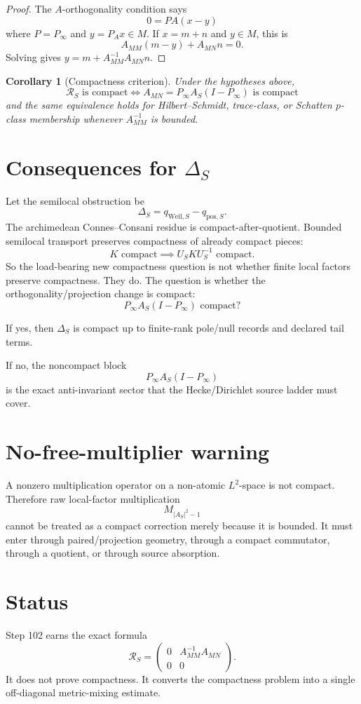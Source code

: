 \documentclass[11pt]{article}
\newtheorem{corollary}{Corollary}
\begin{document}
\begin{proof}
The \(A\)-orthogonality condition says
\[
0=P A(x-y)
\]
where \(P=P_\infty\) and \(y=P_Ax\in M\).  If \(x=m+n\) and \(y\in M\), this is
\[
A_{MM}(m-y)+A_{MN}n=0.
\]
Solving gives \(y=m+A_{MM}^{-1}A_{MN}n\).
\end{proof}

\begin{corollary}[Compactness criterion]
Under the hypotheses above,
\[
\boxed{
\mathcal R_S\text{ is compact}
\iff
A_{MN}=P_\infty A_S(I-P_\infty)\text{ is compact}
}
\]
and the same equivalence holds for Hilbert--Schmidt, trace-class, or Schatten
\(p\)-class membership whenever \(A_{MM}^{-1}\) is bounded.
\end{corollary}

\section{Consequences for \(\Delta_S\)}

Let the semilocal obstruction be
\[
\Delta_S=q_{\mathrm{Weil},S}-q_{\mathrm{pos},S}.
\]
The archimedean Connes--Consani residue is compact-after-quotient.  Bounded
semilocal transport preserves compactness of already compact pieces:
\[
K\text{ compact}\implies U_S K U_S^{-1}\text{ compact}.
\]
So the load-bearing new compactness question is not whether finite local
factors preserve compactness.  They do.  The question is whether the
orthogonality/projection change is compact:
\[
\boxed{
P_\infty A_S(I-P_\infty)\text{ compact?}
}
\]

If yes, then \(\Delta_S\) is compact up to finite-rank pole/null records and
declared tail terms.

If no, the noncompact block
\[
P_\infty A_S(I-P_\infty)
\]
is the exact anti-invariant sector that the Hecke/Dirichlet source ladder must
cover.

\section{No-free-multiplier warning}

A nonzero multiplication operator on a non-atomic \(L^2\)-space is not compact.
Therefore raw local-factor multiplication
\[
M_{|A_S|^2-1}
\]
cannot be treated as a compact correction merely because it is bounded.  It
must enter through paired/projection geometry, through a compact commutator,
through a quotient, or through source absorption.

\section{Status}

Step 102 earns the exact formula
\[
\mathcal R_S=
\begin{pmatrix}
0&A_{MM}^{-1}A_{MN}\\
0&0
\end{pmatrix}.
\]
It does not prove compactness.  It converts the compactness problem into a
single off-diagonal metric-mixing estimate.
\end{document}
